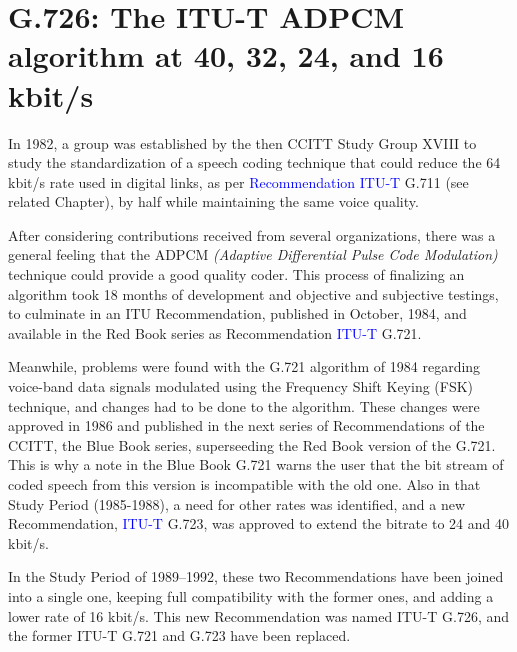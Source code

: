\chapter{G.726: The ITU-T ADPCM algorithm at 40, 32, 24, and 16 kbit/s}

In 1982, a group was established by the then CCITT Study Group XVIII
to study the standardization of a speech coding technique that could
reduce the 64 kbit/s rate used in digital links, as per
\textcolor{blue}{Recommendation ITU-T} G.711 (see related Chapter), by half while
maintaining the same voice quality.

After considering contributions received from several organizations, there was
a general feeling that the ADPCM {\em (Adaptive Differential Pulse Code
Modulation)} technique could provide a good quality coder. This process
of finalizing an algorithm took 18 months of development and objective
and subjective testings, to culminate in an ITU Recommendation,
published in October, 1984, and available in the Red Book series as
Recommendation \textcolor{blue}{ITU-T} G.721.

Meanwhile, problems were found with the G.721 algorithm of 1984
regarding voice-band data signals modulated using the Frequency Shift
Keying (FSK) technique, and changes had to be done to the algorithm.
These changes were approved in 1986 and published in the next series of
Recommendations of the CCITT, the Blue Book series, superseeding the
Red Book version of the G.721. This is why a note in the Blue Book
G.721 warns the user that the bit stream of coded speech from this
version is incompatible with the old one. Also in that Study Period
(1985-1988), a need for other rates was identified, and a new
Recommendation, \textcolor{blue}{ITU-T} G.723, was approved to extend the bitrate to 24 and 40
kbit/s.

In the Study Period of 1989--1992, these two Recommendations have been
joined into a single one, keeping full compatibility with the former
ones, and adding a lower rate of 16 kbit/s. This new Recommendation was
named ITU-T G.726, and the former ITU-T G.721 and G.723 have been replaced.

